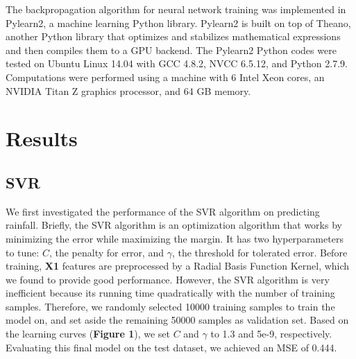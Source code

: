 \documentclass[12pt] {article}
\begin{document}
The backpropagation algorithm for neural network training was implemented in Pylearn2, a machine learning Python library. Pylearn2 is built on top of Theano, another Python library that optimizes and stabilizes mathematical expressions and then compiles them to a GPU backend. The Pylearn2 Python codes were tested on Ubuntu Linux 14.04 with GCC 4.8.2, NVCC 6.5.12, and Python 2.7.9. Computations were performed using a machine with 6 Intel Xeon cores, an NVIDIA Titan Z graphics processor, and 64 GB memory.

\section{Results}
\subsection{SVR}
We first investigated the performance of the SVR algorithm on predicting rainfall. Briefly, the SVR algorithm is an optimization algorithm that works by minimizing the error while maximizing the margin. It has two hyperparameters to tune: $C$, the penalty for error, and $\gamma$, the threshold for tolerated error. Before training, \textbf{X1} features are preprocessed by a Radial Basis Function Kernel, which we found to provide good performance. However, the SVR algorithm is very inefficient because its running time quadratically with the number of training samples. Therefore, we randomly selected 10000 training samples to train the model on, and set aside the remaining 50000 samples as validation set. Based on the learning curves (\textbf{Figure 1}), we set $C$ and $\gamma$ to 1.3 and 5e-9, respectively. Evaluating this final model on the test dataset, we achieved an MSE of 0.444.
\end{document}
